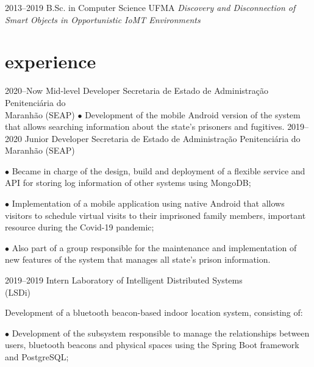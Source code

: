 \documentclass[]{../document-class/twentysecondcv}
\begin{document}
\begin{twenty}
	\twentyitem
		{2013--2019}
		{B.Sc. in Computer Science}
		{UFMA}
		{\emph{Discovery and Disconnection of Smart Objects in Opportunistic IoMT Environments}}
\end{twenty}

\section{experience}

\begin{twenty}
	\twentyitem
		{2020--Now} %
		{Mid-level Developer} %
		{Secretaria de Estado de Administração Penitenciária do \\\hspace*{\fill}Maranhão (SEAP)}
		{$\bullet$ Development of the mobile Android version of the system that allows searching information about the state's prisoners and fugitives.}
	\twentyitem
		{2019--2020} %
		{Junior Developer} %
		{Secretaria de Estado de Administração Penitenciária do \\\hspace*{\fill}Maranhão (SEAP)}
		{$\bullet$ Became in charge of the design, build and deployment of a flexible service and API for storing log information of other systems using MongoDB;\vskip 4pt
			
		$\bullet$ Implementation of a mobile application using native Android that allows visitors to schedule virtual visits to their imprisoned family members,  important resource during the Covid-19 pandemic;\vskip 4pt


		$\bullet$ Also part of a group responsible for the maintenance and implementation of new features of the system that manages all state's prison information.}
		
	\twentyitem
		{2019--2019} %
		{Intern} %
		{Laboratory of Intelligent Distributed Systems \\\hspace*{\fill}(LSDi)}
		{Development of a bluetooth beacon-based indoor location system, consisting of:\vskip 4pt
          
        
		$\bullet$ Development of the subsystem responsible to manage the relationships between users, bluetooth beacons and physical spaces using the Spring Boot framework and PostgreSQL;\vskip 4pt

}
\end{twenty}
\end{document}
